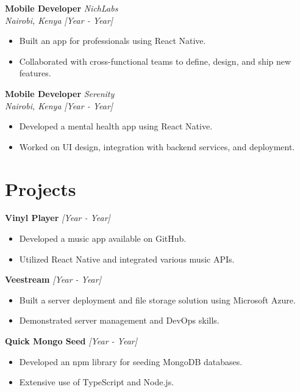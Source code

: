 \documentclass[a4paper,10pt]{article}
\begin{document}
\textbf{Mobile Developer} \hfill \textit{NichLabs} \\
\textit{Nairobi, Kenya} \hfill \textit{[Year - Year]} \\
\begin{itemize}
    \item Built an app for professionals using React Native.
    \item Collaborated with cross-functional teams to define, design, and ship new features.
\end{itemize}

\textbf{Mobile Developer} \hfill \textit{Serenity} \\
\textit{Nairobi, Kenya} \hfill \textit{[Year - Year]} \\
\begin{itemize}
    \item Developed a mental health app using React Native.
    \item Worked on UI design, integration with backend services, and deployment.
\end{itemize}

\section*{Projects}

\textbf{Vinyl Player} \hfill \textit{[Year - Year]} \\
\begin{itemize}
    \item Developed a music app available on GitHub.
    \item Utilized React Native and integrated various music APIs.
\end{itemize}

\textbf{Veestream} \hfill \textit{[Year - Year]} \\
\begin{itemize}
    \item Built a server deployment and file storage solution using Microsoft Azure.
    \item Demonstrated server management and DevOps skills.
\end{itemize}

\textbf{Quick Mongo Seed} \hfill \textit{[Year - Year]} \\
\begin{itemize}
    \item Developed an npm library for seeding MongoDB databases.
    \item Extensive use of TypeScript and Node.js.
\end{itemize}
\end{document}
